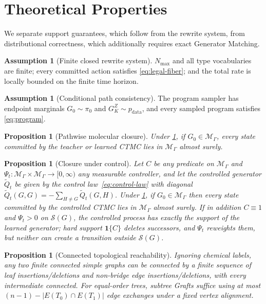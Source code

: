 \documentclass{article}
\newcommand{\M}{\mathcal{M}_{\Gamma}}
\newcommand{\Sset}{\mathcal{S}}
\newcommand{\pdata}{p_{\mathrm{data}}}
\newcommand{\pzero}{\pi_0}
\newcommand{\one}{\mathbf{1}}
\newtheorem{proposition}[theorem]{Proposition}
\theoremstyle{definition}
\newtheorem{assumption}[theorem]{Assumption}
\theoremstyle{remark}
\begin{document}
\section{Theoretical Properties}

We separate support guarantees, which follow from the rewrite system, from distributional correctness, which additionally requires exact Generator Matching.

\begin{assumption}[Finite closed rewrite system]\label{ass:finite}
$N_{\max}$ and all type vocabularies are finite; every committed action satisfies \eqref{eq:legal-fiber}; and the total rate is locally bounded on the finite time horizon.
\end{assumption}

\begin{assumption}[Conditional path consistency]\label{ass:path}
The program sampler has endpoint marginals $G_0\sim\pzero$ and $G_K^Z\sim\pdata$, and every sampled program satisfies \eqref{eq:program}.
\end{assumption}

\begin{proposition}[Pathwise molecular closure]\label{prop:closure}
Under \cref{ass:finite}, if $G_0\in\M$, every state committed by the teacher or learned CTMC lies in $\M$ almost surely.
\end{proposition}

\begin{proposition}[Closure under control]\label{prop:control-closure}
Let $C$ be any predicate on $\M$ and $\Psi_t:\M\times\M\to[0,\infty)$ any measurable controller, and let the controlled generator $\widetilde Q_t$ be given by the control law~\eqref{eq:control-law} with diagonal $\widetilde Q_t(G,G)=-\sum_{H\neq G}\widetilde Q_t(G,H)$. Under \cref{ass:finite}, if $G_0\in\M$ then every state committed by the controlled CTMC lies in $\M$ almost surely. If in addition $C\equiv1$ and $\Psi_t>0$ on $\Sset(G)$, the controlled process has exactly the support of the learned generator; hard support $\one\{C\}$ deletes successors, and $\Psi_t$ reweights them, but neither can create a transition outside $\Sset(G)$.
\end{proposition}

\begin{proposition}[Connected topological reachability]\label{prop:reachability}
Ignoring chemical labels, any two finite connected simple graphs can be connected by a finite sequence of leaf insertions/deletions and non-bridge edge insertions/deletions, with every intermediate connected. For equal-order trees, subtree Grafts suffice using at most $(n-1)-|E(T_0)\cap E(T_1)|$ edge exchanges under a fixed vertex alignment.
\end{proposition}
\end{document}
